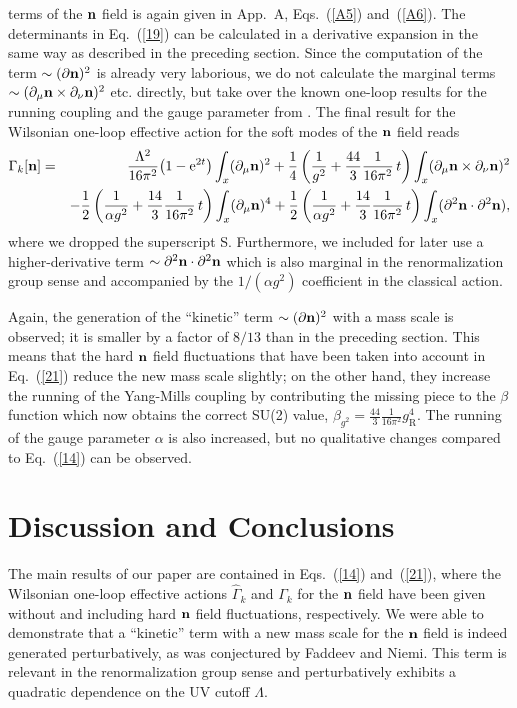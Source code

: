 \documentclass[a4paper,12pt]{article}
\newcommand{\E}{\text{e}}
\newcommand{\re}[1]{~(\ref{#1})}
\begin{document}
terms of the $\mathbf{n}$ field is again given in App.~A, Eqs.\re{A5}
and\re{A6}. The determinants in Eq.\re{19} can be calculated in a
derivative expansion in the same way as described in the preceding
section. Since the computation of the term $\sim (\partial\mathbf{n})^2$ is
already very laborious, we do not calculate the marginal terms $\sim
(\partial_\mu\mathbf{n}\times\partial_\nu\mathbf{n})^2$ etc. directly, but take over
the known one-loop results for the running coupling and the gauge
parameter from \cite{Ellwanger:1996qf}. The final result for the
Wilsonian one-loop effective action for the soft modes of the $\mathbf{n}$
field reads
\begin{eqnarray}
{\Gamma}_k[\mn] &=& \frac{\Lambda^2}{16\pi^2} \bigl(
  1-\E^{2t}\bigr) \int_x (\partial_\mu \mn)^2 
+ \frac{1}{4} \left( \frac{1}{g^2} + \frac{44}{3} \frac{1}{16\pi^2}
  \,t\right) \int_x(\partial_\mu\mn \times \partial_\nu \mn)^2
  \label{21}\\ 
&&-\frac{1}{2} \left( \frac{1}{\alpha g^2} + \frac{14}{3}
  \frac{1}{16\pi^2} \, t\right) \int_x (\partial_\mu \mn)^4
+\frac{1}{2} \left( \frac{1}{\alpha g^2} + \frac{14}{3}
  \frac{1}{16\pi^2} \, t\right)
  \int_x(\partial^2\mn\cdot\partial^2\mn), \nonumber
\end{eqnarray}
where we dropped the superscript S. Furthermore, we included for later
use a higher-derivative term $\sim\partial^2\mathbf{n}\cdot\partial^2\mathbf{n}$
which is also marginal in the renormalization group sense and
accompanied by the $1/(\alpha g^2)$ coefficient in the classical action.

Again, the generation of the ``kinetic'' term $\sim(\partial\mathbf{n})^2$
with a mass scale is observed; it is smaller by a factor of $8/13$ 
than in the preceding section. This means that the hard $\mathbf{n}$ field
fluctuations that have been taken into account in Eq.\re{21} reduce
the new mass scale slightly; on the other hand, they increase the
running of the Yang-Mills coupling by contributing the missing piece
to the $\beta$ function which now obtains the correct SU(2) value,
$\beta_{g^2}=\frac{44}{3} \frac{1}{16\pi^2} g_{\text{R}}^4$. The
running of the gauge parameter $\alpha$ is also increased, but no
qualitative changes compared to Eq.\re{14} can be observed. 


\section{Discussion and Conclusions}
The main results of our paper are contained in Eqs.\re{14} and\re{21},
where the Wilsonian one-loop effective actions $\hat{\Gamma}_k$ and
$\Gamma_k$ for the $\mathbf{n}$ field have been given without and including
hard $\mathbf{n}$ field fluctuations, respectively. We were able to
demonstrate that a ``kinetic'' term with a new mass scale for the
$\mathbf{n}$ field is indeed generated perturbatively, as was conjectured by
Faddeev and Niemi. This term is relevant in the renormalization group
sense and perturbatively exhibits a quadratic dependence on the UV
cutoff $\Lambda$.
\end{document}
